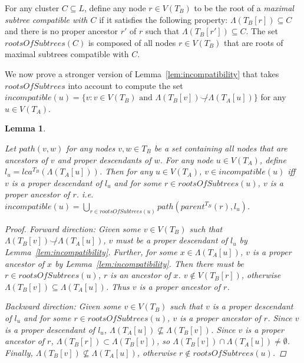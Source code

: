 \documentclass{article}
\newcommand{\compatible}{\smile}
\newcommand{\leafset}{\Lambda}
\newtheorem{incompatibilityrootsofsubtrees}[incompatibility]{Lemma}
\begin{document}
    For any cluster $C \subseteq L$, define any node $r \in V(T_B)$ to be the root of a \textit{maximal subtree compatible with $C$} if it satisfies the following property: $\leafset(T_B[r]) \subseteq C$ and there is no proper ancestor $r'$ of $r$ such that $\leafset(T_B[r']) \subseteq C$. The set $rootsOfSubtrees(C)$ is composed of all nodes $r \in V(T_B)$ that are roots of maximal subtrees compatible with $C$.

    We now prove a stronger version of Lemma~\ref{lem:incompatibility} that takes $rootsOfSubtrees$ into account to compute the set $incompatible(u) = \{v : v \in V(T_B) \text{ and } \leafset(T_B[v]) \not\compatible \leafset(T_A[u])\}$ for any $u \in V(T_A)$.
    \newline

    \begin{incompatibilityrootsofsubtrees}
        \label{lem:incompatibilityrootsofsubtrees}

        Let $path(v, w)$ for any nodes $v, w \in T_B$ be a set containing all nodes that are ancestors of $v$ and proper descendants of $w$. For any node $u \in V(T_A)$, define $l_u = lca^{T_B}(\leafset(T_A[u]))$. Then for any $u \in V(T_A)$, $v \in incompatible(u)$ iff $v$ is a proper descendant of $l_u$ and for some $r \in rootsOfSubtrees(u)$, $v$ is a proper ancestor of $r$. i.e. $incompatible(u) = \bigcup_{r \in rootsOfSubtrees(u)} path(parent^{T_B}(r), l_u)$.

        \begin{proof}
            \textit{Forward direction}: Given some $v \in V(T_B)$ such that $\leafset(T_B[v]) \not\compatible \leafset(T_A[u])$, $v$ must be a proper descendant of $l_u$ by Lemma~\ref{lem:incompatibility}. Further, for some $x \in \leafset(T_A[u])$, $v$ is a proper ancestor of $x$ by Lemma~\ref{lem:incompatibility}. Then there must be $r \in rootsOfSubtrees(u)$, $r$ is an ancestor of $x$. $v \not\in V(T_B[r])$, otherwise $\leafset(T_B[v]) \subseteq \leafset(T_A[u])$. Thus $v$ is a proper ancestor of $r$.

            \textit{Backward direction}: Given some $v \in V(T_B)$ such that $v$ is a proper descendant of $l_u$ and for some $r \in rootsOfSubtrees(u)$, $v$ is a proper ancestor of $r$. Since $v$ is a proper descendant of $l_u$, $\leafset(T_A[u]) \not\subseteq \leafset(T_B[v])$. Since $v$ is a proper ancestor of $r$, $\leafset(T_B[r]) \subset \leafset(T_B[v])$, so $\leafset(T_B[v]) \cap \leafset(T_A[u]) \neq \emptyset$. Finally, $\leafset(T_B[v]) \not\subseteq \leafset(T_A[u])$, otherwise $r \not\in rootsOfSubtrees(u)$.
        \end{proof}
    \end{incompatibilityrootsofsubtrees}
\end{document}
